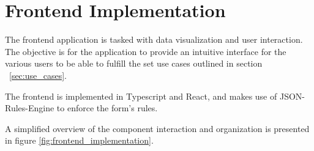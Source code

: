 %
%
\chapter{Frontend Implementation} \label{cap:frontend_implementation}

The frontend application is tasked with data visualization and user interaction. The objective is for the application to provide an intuitive interface for the various users to be able to fulfill the set use cases outlined in section ~\ref{sec:use_cases}.

The frontend is implemented in Typescript and React, and makes use of JSON-Rules-Engine to enforce the form's rules.

A simplified overview of the component interaction and organization is presented in figure \ref{fig:frontend_implementation}.


